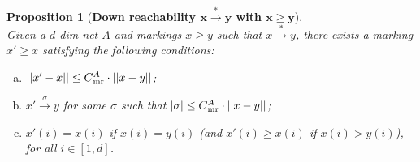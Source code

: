 \documentclass[11pt,a4paper]{amsart}
\newcommand{\step}[1]{\mathrel{\xrightarrow{#1}}}
\newcommand{\reach}{\step{*}}
\newcommand{\nnorm}[1]{||#1||}
\newcommand{\mr}{{}_\textnormal{mr}}
\theoremstyle{plain}
\newtheorem{prop}[thm]{Proposition}
\theoremstyle{definition}
\theoremstyle{defC}
\theoremstyle{thmC}
\begin{document}
	\begin{prop}[\textbf{Down reachability $\bm{x\reach y}$ with
		$\bm{x\geq y}$}]\label{prop:simpletrick}
	\hfill\\
	Given a $d$-dim net $A$ and markings $x\geq y$ such that $x\reach y$, 
there exists a marking $x'\geq x$ satisfying the following conditions:
\begin{enumerate}[a)]	
	\item $\nnorm{x'-x}\leq C\mr^A\cdot \nnorm{x-y}$; 
		\item
			$x'\step{\sigma}y$ for some $\sigma$ 
			such that $|\sigma|\leq
			C\mr^A\cdot\nnorm{x-y}$;
		\item $x'(i)=x(i)$ if $x(i)=y(i)$
			(and $x'(i)\geq x(i)$ if $x(i)>y(i)$), for all
			$i\in[1,d]$.
\end{enumerate}
\end{prop}
\end{document}
